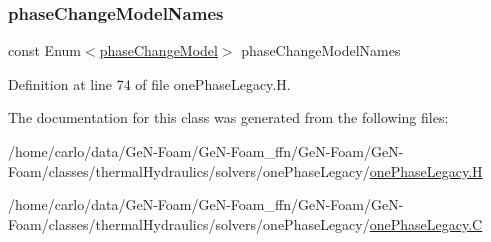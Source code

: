 \subsubsection{\texorpdfstring{phase\+Change\+Model\+Names}{phaseChangeModelNames}}
{\footnotesize\ttfamily const Enum$<$\hyperlink{classFoam_1_1thermalHydraulicsModels_1_1onePhaseLegacy_abff38c5556db16d4d52ef9df211931ff}{phase\+Change\+Model}$>$ phase\+Change\+Model\+Names\hspace{0.3cm}{\ttfamily [static]}}



Definition at line 74 of file one\+Phase\+Legacy.\+H.



The documentation for this class was generated from the following files\+:\begin{DoxyCompactItemize}
\item 
/home/carlo/data/\+Ge\+N-\/\+Foam/\+Ge\+N-\/\+Foam\+\_\+ffn/\+Ge\+N-\/\+Foam/\+Ge\+N-\/\+Foam/classes/thermal\+Hydraulics/solvers/one\+Phase\+Legacy/\hyperlink{onePhaseLegacy_8H}{one\+Phase\+Legacy.\+H}\item 
/home/carlo/data/\+Ge\+N-\/\+Foam/\+Ge\+N-\/\+Foam\+\_\+ffn/\+Ge\+N-\/\+Foam/\+Ge\+N-\/\+Foam/classes/thermal\+Hydraulics/solvers/one\+Phase\+Legacy/\hyperlink{onePhaseLegacy_8C}{one\+Phase\+Legacy.\+C}\end{DoxyCompactItemize}
